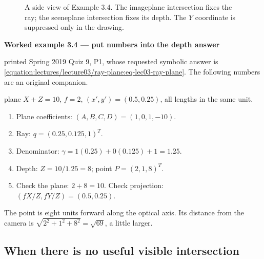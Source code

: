 \documentclass[letterpaper,11pt,english,openany,oneside]{jupyterBook}
\begin{document}
\begin{figure}[H]
\centering
\capstart

\noindent{}
\caption{A side view of Example 3.4. The image\sphinxhyphen{}plane intersection fixes the ray; the scene\sphinxhyphen{}plane intersection fixes its depth. The \(Y\) coordinate is suppressed only in the drawing.}\label{\detokenize{lectures/lecture03/ray-plane:fig-lec03-ray-plane}}\end{figure}
\label{\detokenize{lectures/lecture03/ray-plane:ex-lec03-plane}}
\begin{TextbookBox}
\textbf{Worked example 3.4 — put numbers into the depth answer}\par\smallskip

\sphinxAtStartPar
{} printed Spring 2019 Quiz 9, P1, whose requested symbolic answer is \eqref{equation:lectures/lecture03/ray-plane:eq-lec03-ray-plane}. The following numbers are an original companion.

\sphinxAtStartPar
{} plane \(X+Z=10\), \(f=2\), \((x',y')=(0.5,0.25)\), all lengths in the same unit.
\begin{enumerate}
%
\item {}
\sphinxAtStartPar
Plane coefficients: \((A,B,C,D)=(1,0,1,-10)\).

\item {}
\sphinxAtStartPar
Ray: \(q=(0.25,0.125,1)^T\).

\item {}
\sphinxAtStartPar
Denominator: \(\gamma=1(0.25)+0(0.125)+1=1.25\).

\item {}
\sphinxAtStartPar
Depth: \(Z=10/1.25=8\); point \(P=(2,1,8)^T\).

\item {}
\sphinxAtStartPar
Check the plane: \(2+8=10\). Check projection: \((fX/Z,fY/Z)=(0.5,0.25)\).

\end{enumerate}

\sphinxAtStartPar
The point is eight units forward along the optical axis. Its distance from the camera is \(\sqrt{2^2+1^2+8^2}=\sqrt{69}\), a little larger.

\end{TextbookBox}


\subsection{When there is no useful visible intersection}
\label{\detokenize{lectures/lecture03/ray-plane:when-there-is-no-useful-visible-intersection}}
\end{document}
